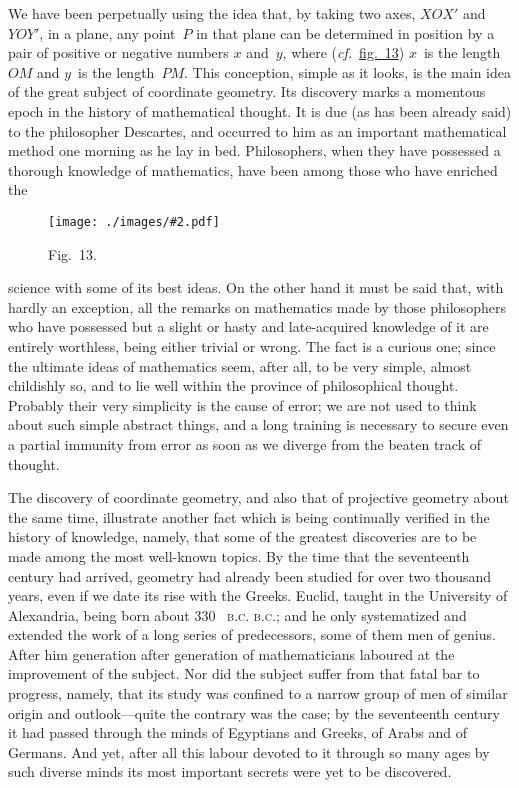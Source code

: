 \documentclass[12pt,leqno]{book}[2005/09/16]
\makeatletter
\newcommand{\Chg}[2]{#2}
\newcommand{\Graphic}[2]{%
  \phantomsection\label{fig:#2}%
  \texttt{[image: ./images/\#2.pdf]}%
}
\newcommand{\DefWidth}{4in}%
\newcommand{\Figure}[2][\DefWidth]{%
  \begin{figure}[hbt!]
    \centering
    \phantomsection\label{fig:#2}
    \Graphic{#1}{fig#2}
    \caption{Fig.~#2.}
  \end{figure}\ignorespaces%
}
\newcommand{\Fig}[2][Fig.]{\hyperref[fig:#2]{#1~#2}}
\newcommand{\PageSep}[1]{\ignorespaces}
\newcommand{\cf}{\emph{cf.}}
\newcommand{\SCAbbrev}[3]{%
  \ifthenelse{\equal{#3}{.}}%
  {\textsc{\MakeLowercase{#1.#2}.}}%
  {\textsc{\MakeLowercase{#1.#2}.}\@#3}%
}
\newcommand{\BC}[1]{\SCAbbrev{B}{C}{#1}}
\makeatother
\begin{document}
We have been perpetually using the idea
that, by taking two axes, $XOX'$ and~$YOY'$,
in a plane, any point~$P$ in that plane can be
determined in position by a pair of positive
or negative numbers $x$ and~$y$, where (\Chg{cf.}{\cf}\
\Fig[fig.]{13}) $x$~is the length~$OM$ and $y$~is the length~$PM$.
This conception, simple as it looks, is
the main idea of the great subject of coordinate
geometry. Its discovery marks a
momentous epoch in the history of mathematical
thought. It is due (as has been
\PageSep{113}
already said) to the philosopher Descartes,
%
and occurred to him as an important mathematical
method one morning as he lay in bed.
Philosophers, when they have possessed a
thorough knowledge of mathematics, have
been among those who have enriched the
\Figure{13}
science with some of its best ideas. On the
other hand it must be said that, with hardly
an exception, all the remarks on mathematics
made by those philosophers who have possessed
but a slight or hasty and late-acquired
knowledge of it are entirely worthless, being
either trivial or wrong. The fact is a curious
one; since the ultimate ideas of mathematics
\PageSep{114}
seem, after all, to be very simple, almost
childishly so, and to lie well within the
province of philosophical thought. Probably
their very simplicity is the cause of error; we
are not used to think about such simple
abstract things, and a long training is necessary
to secure even a partial immunity from
error as soon as we diverge from the beaten
track of thought.

The discovery of coordinate geometry, and
also that of projective geometry about the
same time, illustrate another fact which is
being continually verified in the history of
knowledge, namely, that some of the greatest
discoveries are to be made among the most
well-known topics. By the time that the
seventeenth century had arrived, geometry
had already been studied for over two thousand
years, even if we date its rise with the Greeks.
Euclid, taught in the University of Alexandria,
%
being born about 330~\BC; and he only
systematized and extended the work of a long
series of predecessors, some of them men of
genius. After him generation after generation
of mathematicians laboured at the improvement
of the subject. Nor did the
subject suffer from that fatal bar to progress,
namely, that its study was confined to a
narrow group of men of similar origin and
outlook---quite the contrary was the case;
by the seventeenth century it had passed
\PageSep{115}
through the minds of Egyptians and Greeks,
of Arabs and of Germans. And yet, after all
this labour devoted to it through so many
ages by such diverse minds its most important
secrets were yet to be discovered.
\end{document}
